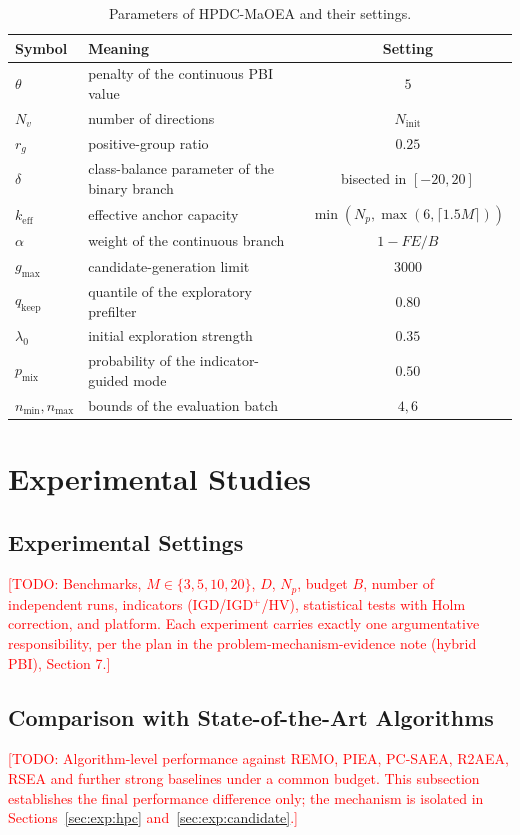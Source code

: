 \documentclass[11pt,a4paper]{article}
\newcommand{\keff}{k_{\mathrm{eff}}}
\newcommand{\TODO}[1]{\textcolor{red}{[TODO: #1]}}
\begin{document}
\begin{table}[t]
\centering
\caption{Parameters of HPDC-MaOEA and their settings.}
\label{tab:params}
\small
\begin{tabular}{llc}
\toprule
Symbol & Meaning & Setting \\
\midrule
$\theta$ & penalty of the continuous PBI value & $5$ \\
$N_v$ & number of directions & $N_{\mathrm{init}}$ \\
$r_g$ & positive-group ratio & $0.25$ \\
$\delta$ & class-balance parameter of the binary branch &
  bisected in $[-20,20]$ \\
$\keff$ & effective anchor capacity & $\min(N_p,\max(6,\lceil1.5M\rceil))$ \\
$\alpha$ & weight of the continuous branch & $1-FE/B$ \\
$g_{\max}$ & candidate-generation limit & $3000$ \\
$q_{\mathrm{keep}}$ & quantile of the exploratory prefilter & $0.80$ \\
$\lambda_0$ & initial exploration strength & $0.35$ \\
$p_{\mathrm{mix}}$ & probability of the indicator-guided mode & $0.50$ \\
$n_{\min},n_{\max}$ & bounds of the evaluation batch & $4,6$ \\
\bottomrule
\end{tabular}
\end{table}

\section{Experimental Studies}
\label{sec:exp}

\subsection{Experimental Settings}
\label{sec:exp:settings}
\TODO{Benchmarks, $M\in\{3,5,10,20\}$, $D$, $N_p$, budget $B$, number of
independent runs, indicators (IGD/IGD$^+$/HV), statistical tests with Holm
correction, and platform. Each experiment carries exactly one argumentative
responsibility, per the plan in the problem-mechanism-evidence note (hybrid
PBI), Section 7.}

\subsection{Comparison with State-of-the-Art Algorithms}
\label{sec:exp:comparison}
\TODO{Algorithm-level performance against REMO, PIEA, PC-SAEA, R2AEA, RSEA and
further strong baselines under a common budget. This subsection establishes the
final performance difference only; the mechanism is isolated in
Sections~\ref{sec:exp:hpc} and~\ref{sec:exp:candidate}.}
\end{document}
